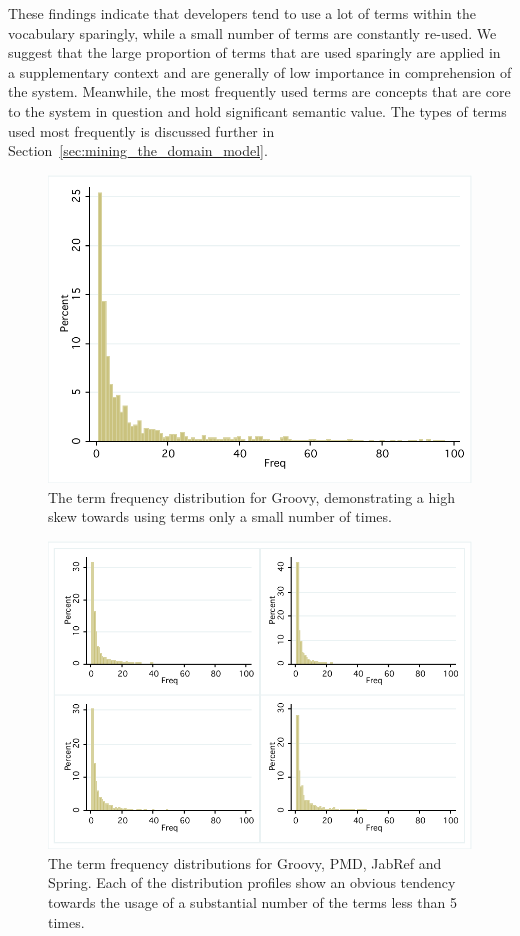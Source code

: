 These findings indicate that developers tend to use a lot of terms within the vocabulary sparingly, while a small number of terms are constantly re-used. We suggest that the large proportion of terms that are used sparingly are applied in a supplementary context and are generally of low importance in comprehension of the system. Meanwhile, the most frequently used terms are concepts that are core to the system in question and hold significant semantic value. The types of terms used most frequently is discussed further in Section~\ref{sec:mining_the_domain_model}.

\begin{figure}[t]
\centering
\includegraphics[width=\textwidth]{Figures/Vocab-GroovyFreqDist.pdf}
\caption{The term frequency distribution for Groovy, demonstrating a high skew towards using terms only a small number of times.}
\label{fig:vocab-freq-dist-groovy}
\end{figure}

\begin{figure}[t]
\centering
\includegraphics[width=\textwidth]{Figures/Vocab-FrequencyDistComparison.pdf}
\caption{The term frequency distributions for Groovy, PMD, JabRef and Spring. Each of the distribution profiles show an obvious tendency towards the usage of a substantial number of the terms less than 5 times.}
\label{fig:vocab-freq-dist-comparison}
\end{figure}

